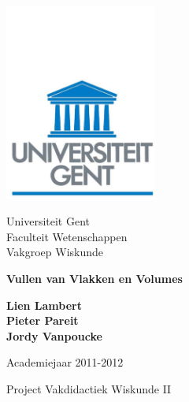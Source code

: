 \documentclass[12pt]{article}
\numberwithin{equation}{section} %
\theoremstyle{plain}  \newtheorem{stel}{Stelling}[section]
\theoremstyle{plain}  \newtheorem{lemma}[stel]{Lemma}
\theoremstyle{plain}  \newtheorem{gevolg}[stel]{Gevolg}
\theoremstyle{definition}  \newtheorem{defi}[stel]{Definitie}
\theoremstyle{definition} \newtheorem{vb}[stel]{Voorbeeld}
\theoremstyle{definition} \newtheorem{vbn}[stel]{Voorbeelden}
\theoremstyle{definition}  \newtheorem{opm}[stel]{Opmerking}
\theoremstyle{plain}  \newtheorem{opdracht}{Opdracht}
\begin{document}
\thispagestyle{empty}

\begin{center}
 \begin{minipage}{7cm}
\begin{center}


\includegraphics[width=5cm]{ruglogo.pdf}


 {\large
Universiteit Gent \\
Faculteit  Wetenschappen \\
Vakgroep  Wiskunde
} \end{center}\end{minipage}

\vspace{3cm}

 {\Huge\bf 
  Vullen van Vlakken en Volumes}
  
\baselineskip=12pt
\vspace{1.5cm}

{\large\bf  Lien Lambert }\\
\vspace{0.5cm}
{\large \bf Pieter Pareit }\\
\vspace{0.5cm}
{\large \bf Jordy Vanpoucke}\\

\baselineskip=12pt

\vspace{2cm}

 
\bigskip

{\large Academiejaar 2011-2012}




\end{center}

\vfill

\hspace*{\fill}
\begin{minipage}{8cm}
\noindent   Project Vakdidactiek Wiskunde II
 \end{minipage}
\end{document}
